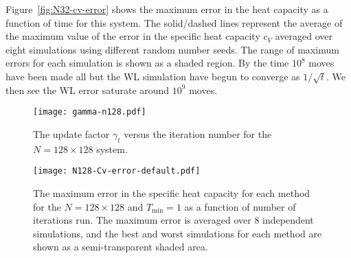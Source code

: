 Figure~\ref{fig:N32-cv-error} shows the maximum error in the heat capacity as a function of time for
this system. The solid/dashed lines
represent the average of the maximum value of the error in the specific heat capacity $c_V$ averaged
over eight simulations using different random number seeds. The range of maximum
errors for each simulation is shown as a shaded region. By
the time $10^8$ moves have been made all but the WL simulation have begun to
converge as $1/\sqrt{t}$. We then see the WL error saturate around $10^9$ moves.

\begin{figure}
\texttt{[image: gamma-n128.pdf]}
  \caption{
  The update factor $\gamma_t$ versus the iteration number for the $N=128 \times 128$
  system.}
  \label{fig:N128-gamma}
\end{figure}

\begin{figure}
  \texttt{[image: N128-Cv-error-default.pdf]}
  \caption{The maximum error in the specific heat capacity for each method for the $N=128 \times 128$ and $T_{\min} = 1$ as a function of number of iterations run.  The maximum error is averaged over 8 independent simulations, and the best and worst simulations for each method are shown as a semi-transparent shaded area.}
  \label{fig:N128-cv-error}
\end{figure}


